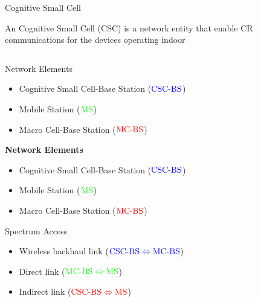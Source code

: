\documentclass[16pt]{beamer}
\newcommand{\fs}[2]{\fontsize{#1 pt}{#2}\selectfont}
\begin{document}
\begin{frame}[t]{Cognitive Small Cell}
		\vspace{-0.3cm}
		\fs{7}{8}
		\begin{block}{}%
		An Cognitive Small Cell (CSC) is a network entity that enable CR communications for the devices operating indoor 
		\end{block}
	\begin{columns}
	\begin{column}{0.37\columnwidth}
		\vspace{-0.1cm}
		\only<1,3->
		{	
			\begin{block}{\scriptsize Network Elements}
				\begin{itemize}
					\item Cognitive Small Cell-Base Station ($\color{blue}{\text{CSC-BS}}$)
					\item Mobile Station ($\color{green}{\text{MS}}$) 
					\item Macro Cell-Base Station ($\color{red}{\text{MC-BS}}$) 
				\end{itemize}
			\end{block}
		}
		{
			\begin{block}{\scriptsize \textbf{Network Elements}}
				\begin{itemize}
					\item Cognitive Small Cell-Base Station ($\color{blue}{\text{CSC-BS}}$)
					\item Mobile Station ($\color{green}{\text{MS}}$) 
					\item Macro Cell-Base Station ($\color{red}{\text{MC-BS}}$) 
				\end{itemize}
			\end{block}
		}
		{
			\begin{block}{\scriptsize Spectrum Access}
				\begin{itemize}
					\item Wireless backhaul link ($\color{blue}{\text{CSC-BS} \Leftrightarrow \text{MC-BS}}$)
					\item Direct link ($\color{green}{\text{MC-BS} \Leftrightarrow \text{MS}}$) 
					\item Indirect link ($\color{red}{\text{CSC-BS} \Leftrightarrow \text{MS}}$) 
				\end{itemize}
			\end{block}
}
\end{column}
\end{columns}
\end{frame}
\end{document}
